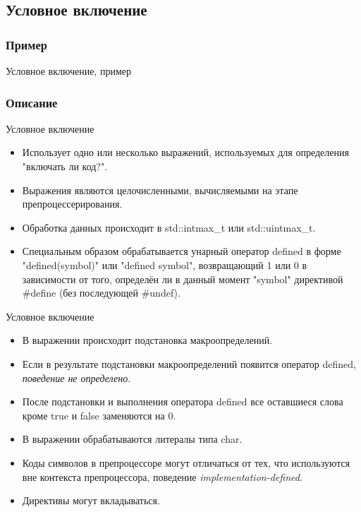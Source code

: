    \subsection{Условное включение}
    \subsubsection{Пример}
    \begin{frame}{Условное включение, пример}
        
    \end{frame}
    \subsubsection{Описание}
    \begin{frame}{Условное включение}
        \begin{itemize}
            \item Использует одно или несколько выражений, используемых для определения "включать ли код?".
            \item Выражения являются целочисленными, вычисляемыми на этапе препроцессерирования.
            \item Обработка данных происходит в std::intmax\_t или std::uintmax\_t.
            \item Специальным образом обрабатывается унарный оператор defined в форме "defined(symbol)" или "defined symbol",
                возвращающий 1 или 0 в зависимости от того, определён ли в данный момент "symbol" директивой \#define (без последующей \#undef).
        \end{itemize}
    \end{frame}
    \begin{frame}{Условное включение}
        \begin{itemize}
            \item В выражении происходит подстановка макроопределений.
            \item Если в результате подстановки макроопределений появится оператор defined, \textit{поведение не определено}.
            \item После подстановки и выполнения оператора defined все оставшиеся слова кроме true и false заменяются на 0.
            \item В выражении обрабатываются литералы типа char.
            \item Коды символов в препроцессоре могут отличаться от тех, что используются вне контекста препроцессора, поведение \textit{implementation-defined}.
            \item Директивы могут вкладываться.
        \end{itemize}
    \end{frame}
